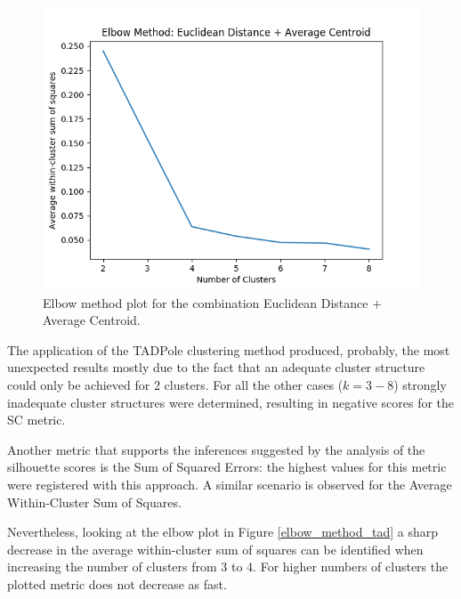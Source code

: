 \documentclass[9pt,journal,compsoc]{IEEEtran}
\begin{document}
\begin{figure}[ht]
	\centering
	\includegraphics[scale=0.5]{images/reduced_euclidean_Average.png}
	\caption{Elbow method plot for the combination Euclidean Distance + Average Centroid.}
	\label{elbow_method_euclidean_reduced}
\end{figure}

The application of the TADPole clustering method produced, probably, the most unexpected results mostly due to the fact that an adequate cluster structure could only be achieved for 2 clusters. For all the other cases ($k = 3 - 8$) strongly inadequate cluster structures were determined, resulting in negative scores for the SC metric.

Another metric that supports the inferences suggested by the analysis of the silhouette scores is the Sum of Squared Errors: the highest values for this metric were registered with this approach. A similar scenario is observed for the Average Within-Cluster Sum of Squares.

Nevertheless, looking at the elbow plot in Figure \ref{elbow_method_tad} a sharp decrease in the average within-cluster sum of squares can be identified when increasing the number of clusters from 3 to 4. For higher numbers of clusters the plotted metric does not decrease as fast.
\end{document}

